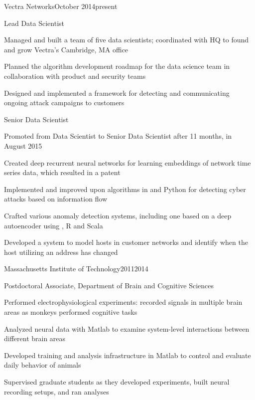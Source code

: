 \documentclass{report}
\begin{document}




  \begin{work_location}{Vectra Networks}{October 2014}{present}

    \begin{position}{Lead Data Scientist}
      \item {} Managed and built a team of five data scientists; coordinated with HQ to found and grow Vectra's Cambridge, MA office
      \item Planned the algorithm development roadmap for the data science team in collaboration with product and security teams
      \item Designed and implemented a framework for detecting and communicating ongoing attack campaigns to customers
    \end{position}

    \begin{position}{Senior Data Scientist}
      \item Promoted from Data Scientist to Senior Data Scientist after 11 months, in August 2015
      \item Created deep recurrent neural networks for learning embeddings of network time series data, which resulted in a patent
      \item Implemented and improved upon algorithms in \CC{} and Python for detecting cyber attacks based on information flow
      \item Crafted various anomaly detection systems, including one based on a deep autoencoder using \HzO{}, R and Scala
      \item Developed a system to model hosts in customer networks and identify when the host utilizing an address has changed
    \end{position}

  \end{work_location}



  \begin{work_location}{Massachusetts Institute of Technology}{2011}{2014}

    \begin{position}{Postdoctoral Associate, Department of Brain and Cognitive Sciences}
      \item {} Performed electrophysiological experiments: recorded signals in multiple brain areas as monkeys performed cognitive tasks
      \item Analyzed neural data with Matlab to examine system-level interactions between different brain areas
      \item Developed training and analysis infrastructure in Matlab to control and evaluate daily behavior of animals
      \item Supervised graduate students as they developed experiments, built neural recording setups, and ran analyses
    \end{position}

  \end{work_location}
\end{document}
